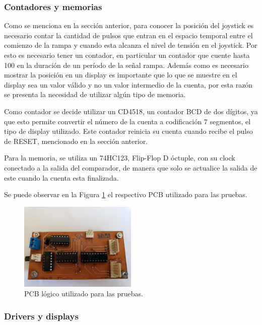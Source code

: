 \subsubsection{Contadores y memorias}
Como se menciona en la secci\'on anterior, para conocer la posici\'on del joystick es necesario contar la cantidad de pulsos que entran en el espacio temporal entre el comienzo de la rampa y cuando esta alcanza el nivel de tensi\'on en el joystick. Por esto es necesario tener un contador, en particular un contador que cuente hasta 100 en la duraci\'on de un per\'iodo de la se\~nal rampa. Adem\'as como es necesario mostrar la posici\'on en un display es importante que lo que se muestre en el display sea un valor v\'alido y no un valor intermedio de la cuenta, por esta raz\'on se presenta la necesidad de utilizar alg\'un tipo de memoria.


Como contador se decide utilizar un CD4518, un contador BCD de dos d\'igitos, ya que esto permite convertir el n\'umero de la cuenta a codificaci\'on 7 segmentos, el tipo de display utilizado. Este contador reinicia su cuenta cuando recibe el pulso de RESET, mencionado en la secci\'on anterior.

Para la memoria, se utiliza un 74HC123, Flip-Flop D \'octuple,  con su clock conectado a la salida del comparador, de manera que solo se actualice la salida de este cuando la cuenta esta finalizada. 

Se puede observar en la Figura \ref{fig:LOGIC_PCB} el respectivo PCB utilizado para las pruebas.
\begin{figure}[H]
    \centering
    \includegraphics[width=0.5\textwidth]{../EJ8/Recursos/DIGITAL_PCB}
    \caption{PCB l\'ogico utilizado para las pruebas.}
    \label{fig:LOGIC_PCB}
\end{figure}

\subsubsection{Drivers y displays}

